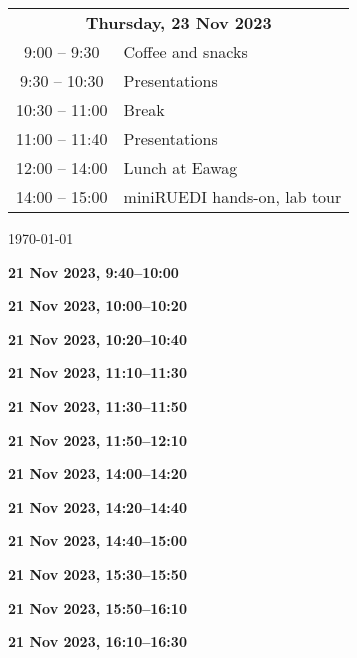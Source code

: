 \documentclass[12pt]{extbook}
\renewcommand{\dateseparator}{--}
\newcommand{\breaktime}[1]{
\bigskip
\begin{center}
\Large\bfseries ***** Break #1 *****
\end{center}
\bigskip}
\renewcommand{\breaktime}[1]{}
\newcommand{\abstract}[2]{{
\bigskip
\begin{center}
\large\bfseries #1
\end{center}}
\par

\clearpage
}
\begin{document}
\begin{center}
\begin{tabular}{c@{\hskip 0.5in}l}
\multicolumn{2}{c}{\bf Thursday, 23 Nov 2023}\\[2ex]
\phantom{1}9:00  -- \phantom{1}9:30	  &	Coffee and snacks\\
\phantom{1}9:30  -- 10:30	&	Presentations\\   %
10:30 -- 11:00	&	Break\\
11:00 -- 11:40	& Presentations\\   %
12:00 -- 14:00	&	Lunch at Eawag\\
14:00 -- 15:00	&	miniRUEDI hands-on, lab tour\\[1.5ex]

\end{tabular}

\enlargethispage{2cm}
\vfill
\renewcommand{\dateseparator}{--}
{\hfill \tiny \today}

\end{center}

\clearpage






\abstract{21 Nov 2023, 9:40--10:00}{abstracts/Daskalopoulou} %
\abstract{21 Nov 2023, 10:00--10:20}{abstracts/Kimani} %
\abstract{21 Nov 2023, 10:20--10:40}{abstracts/Mtili} %

\breaktime{30 min}

\abstract{21 Nov 2023, 11:10--11:30}{abstracts/Giroud} %
\abstract{21 Nov 2023, 11:30--11:50}{abstracts/Roques} %
\abstract{21 Nov 2023, 11:50--12:10}{abstracts/Lightfoot} %

\breaktime{ / Lunch}

\abstract{21 Nov 2023, 14:00--14:20}{abstracts/Dutoit} %
\abstract{21 Nov 2023, 14:20--14:40}{abstracts/Strauch_Zimmer} %
\abstract{21 Nov 2023, 14:40--15:00}{abstracts/Finger} %

\breaktime{30 min}

\abstract{21 Nov 2023, 15:30--15:50}{abstracts/Kipfer} %
\abstract{21 Nov 2023, 15:50--16:10}{abstracts/vanRooyen} %
\abstract{21 Nov 2023, 16:10--16:30}{abstracts/Ortega} %
\end{document}
